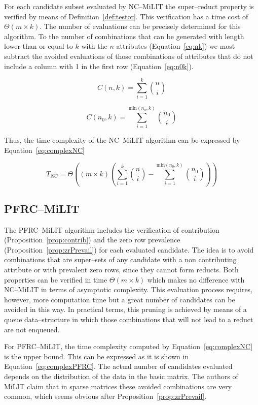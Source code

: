 \documentclass[citenumber]{llncs}
\begin{document}
	For each candidate subset evaluated by NC--MiLIT the super--reduct property is verified by means of Definition~\ref{def:testor}. This verification has a time cost of $\Theta(m\times k)$. The number of evaluations can be precisely determined for this algorithm.  To the number of combinations that can be generated with length lower than or equal to $k$ with the $n$ attributes (Equation~\ref{eq:nk}) we most subtract the avoided evaluations of those combinations of attributes that do not include a column with 1 in the first row (Equation~\ref{eq:n0k}).
	
	\begin{equation}
	C(n,k) = \sum_{i=1}^{k} \binom{n}{i}\label{eq:nk}
	\end{equation}
	
	\begin{equation}
	C(n_0,k)= \sum_{i=1}^{\mathrm{min}(n_0,k)} \binom{n_0}{i}\label{eq:n0k}
	\end{equation}
	
	Thus, the time complexity of the NC--MiLIT algorithm can be expressed by Equation~\ref{eq:complexNC}
	
	\begin{equation}
	T_{NC} = \Theta\left((m\times k)\left(\sum_{i=1}^{k} \binom{n}{i} - \sum_{i=1}^{\mathrm{min}(n_0,k)} \binom{n_0}{i}\right)\right)\label{eq:complexNC}
	\end{equation}
%	
\subsection{PFRC--MiLIT}	
%
	The PFRC--MiLIT algorithm includes the verification of contribution (Proposition~\ref{prop:contrib}) and the zero row prevalence (Proposition~\ref{prop:zrPrevail}) for each evaluated candidate. The idea is to avoid combinations that are super--sets of any candidate with a non contributing attribute or with prevalent zero rows, since they cannot form reducts. Both properties can be verified in time $\Theta(m\times k)$ which makes no difference with NC--MiLIT in terms of asymptotic complexity. This evaluation process requires, however, more computation time but a great number of candidates can be avoided in this way. In practical terms, this pruning is achieved by means of a queue data--structure in which those combinations that will not lead to a reduct are not enqueued. 
	
	For PFRC--MiLIT, the time complexity computed by Equation~\ref{eq:complexNC} is the upper bound. This can be expressed as it is shown in Equation~\ref{eq:complexPFRC}. The actual number of candidates evaluated depends on the distribution of the data in the basic matrix. The authors of MiLIT claim that in sparse matrices these avoided combinations are very common, which seems obvious after Proposition~\ref{prop:zrPrevail}.
	
\end{document}
